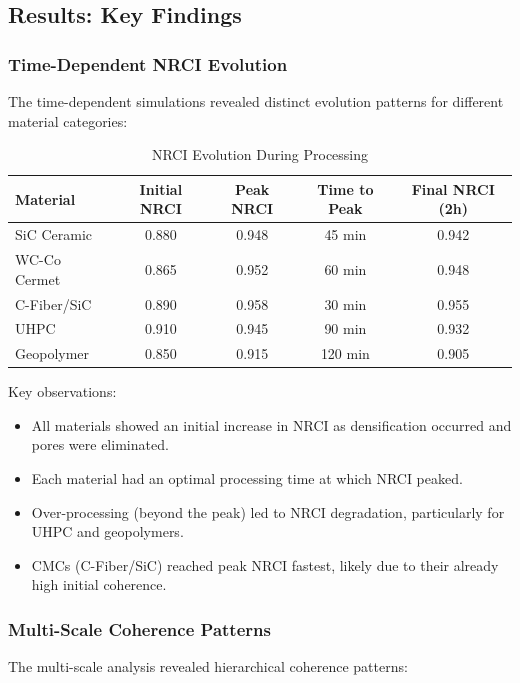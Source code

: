 \documentclass[11pt,a4paper]{article}
\begin{document}
\subsection{Results: Key Findings}

\subsubsection{Time-Dependent NRCI Evolution}

The time-dependent simulations revealed distinct evolution patterns for different material categories:

\begin{table}[H]
\centering
\caption{NRCI Evolution During Processing}
\begin{tabular}{lcccc}
\toprule
\textbf{Material} & \textbf{Initial NRCI} & \textbf{Peak NRCI} & \textbf{Time to Peak} & \textbf{Final NRCI (2h)} \\
\midrule
SiC Ceramic & 0.880 & 0.948 & 45 min & 0.942 \\
WC-Co Cermet & 0.865 & 0.952 & 60 min & 0.948 \\
C-Fiber/SiC & 0.890 & 0.958 & 30 min & 0.955 \\
UHPC & 0.910 & 0.945 & 90 min & 0.932 \\
Geopolymer & 0.850 & 0.915 & 120 min & 0.905 \\
\bottomrule
\end{tabular}
\end{table}

Key observations:

\begin{itemize}
    \item All materials showed an initial increase in NRCI as densification occurred and pores were eliminated.
    \item Each material had an optimal processing time at which NRCI peaked.
    \item Over-processing (beyond the peak) led to NRCI degradation, particularly for UHPC and geopolymers.
    \item CMCs (C-Fiber/SiC) reached peak NRCI fastest, likely due to their already high initial coherence.
\end{itemize}

\subsubsection{Multi-Scale Coherence Patterns}

The multi-scale analysis revealed hierarchical coherence patterns:
\end{document}
